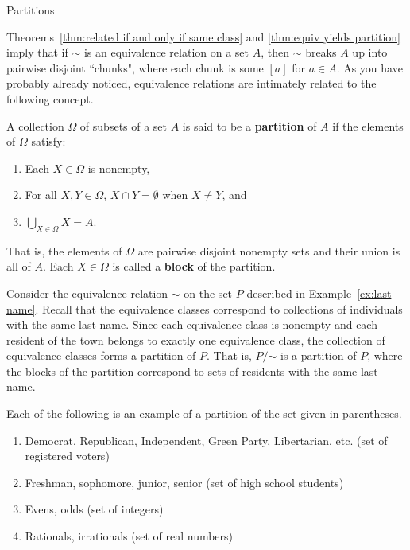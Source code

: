 \begin{section}{Partitions}

Theorems~\ref{thm:related if and only if same class} and \ref{thm:equiv yields partition} imply that if $\sim$ is an equivalence relation on a set $A$, then $\sim$ breaks $A$ up into pairwise disjoint ``chunks", where each chunk is some $[a]$ for $a\in A$.  As you have probably already noticed, equivalence relations are intimately related to the following concept.

\begin{definition}\label{def:partition}
A collection $\Omega$ of subsets of a set $A$ is said to be a \textbf{partition} of $A$ if the elements of $\Omega$ satisfy:
\begin{enumerate}[label=\textrm{(\alph*)}]
\item Each $X\in \Omega$ is nonempty,
\item For all $X,Y\in\Omega$, $X\cap Y=\emptyset$ when $X\neq Y$, and
\item $\displaystyle \bigcup_{X\in\Omega}X=A$.
\end{enumerate}
That is, the elements of $\Omega$ are pairwise disjoint nonempty sets and their union is all of $A$. Each $X\in \Omega$ is called a \textbf{block} of the partition.
\end{definition}

\begin{example}\label{ex:last name revisited}
Consider the equivalence relation $\sim$ on the set $P$ described in Example~\ref{ex:last name}.  Recall that the equivalence classes correspond to collections of individuals with the same last name. Since each equivalence class is nonempty and each resident of the town belongs to exactly one equivalence class, the collection of equivalence classes forms a partition of $P$.  That is, $P/\mathord\sim$ is a partition of $P$, where the blocks of the partition correspond to sets of residents with the same last name.
\end{example}

\begin{example}
Each of the following is an example of a partition of the set given in parentheses.  %
\begin{enumerate}[label=\textrm{(\alph*)}]
\item Democrat, Republican, Independent, Green Party, Libertarian, etc. (set of registered voters)
\item Freshman, sophomore, junior, senior (set of high school students)
\item Evens, odds (set of integers)
\item Rationals, irrationals (set of real numbers)
\end{enumerate}
\end{example}


\end{section}
